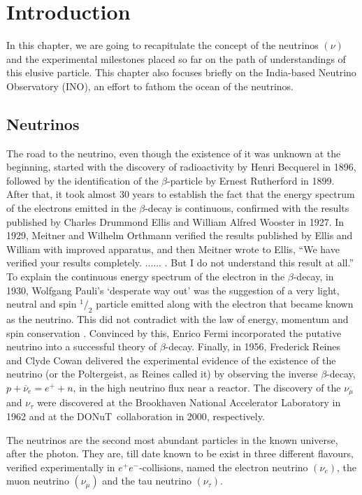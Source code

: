 \chapter{Introduction}
In this chapter, we are going to recapitulate the concept of the neutrinos $\left(\nu\right)$ and the experimental milestones placed so far on the path of understandings of this elusive particle. This chapter also focuses briefly on the India-based Neutrino Observatory (INO), an effort to fathom the ocean of the neutrinos.

\section{Neutrinos}
The road to the neutrino\cite{roadtoneut}, even though the existence of it was unknown at the beginning, started with the discovery of radioactivity by Henri Becquerel in 1896, followed by the identification of the $\beta$-particle by Ernest Rutherford in
1899. After that, it took almost 30 years to establish the fact that the energy spectrum of the electrons emitted in the $\beta$-decay is continuous, confirmed with the results published by Charles Drummond Ellis and William Alfred Wooster in 1927. In 1929, Meitner and Wilhelm Orthmann verified the results published by Ellis and William with improved apparatus, and then Meitner wrote to Ellis, ``We have verified your results completely. ...... . But I do not understand this result at all.'' To explain the continuous energy spectrum of the electron in the $\beta$-decay, in 1930, Wolfgang Pauli's `desperate way out' was the suggestion of a very light, neutral and spin $^1/_2$ particle emitted along with the electron that became known as the neutrino. This did not contradict with the law of energy, momentum and spin conservation%
. Convinced by this, Enrico Fermi incorporated the putative neutrino into a successful theory of $\beta$-decay. Finally, in 1956, Frederick Reines and Clyde Cowan delivered the experimental evidence of the existence of the neutrino (or the Poltergeist, as Reines called it) by observing the inverse $\beta$-decay, $p+\overline{\nu}_e=e^++n$, in the high neutrino flux near a reactor.
The discovery of the $\nu_{\mu}$ and $\nu_{\tau}$ were discovered at the Brookhaven National Accelerator Laboratory in 1962\cite{muonneut1962} and at the DONuT~collaboration in 2000\cite{tauneut2001}, respectively.

The neutrinos are the second most abundant particles in the known universe, after the photon. They are, till date known to be exist in three different flavours, verified experimentally in \mbox{$e^+e^-$-collisions\cite{numberneut}}, named the electron neutrino $\left(\nu_e\right)$, the muon neutrino $\left(\nu_{\mu}\right)$ and the tau neutrino $\left(\nu_{\tau}\right)$.

